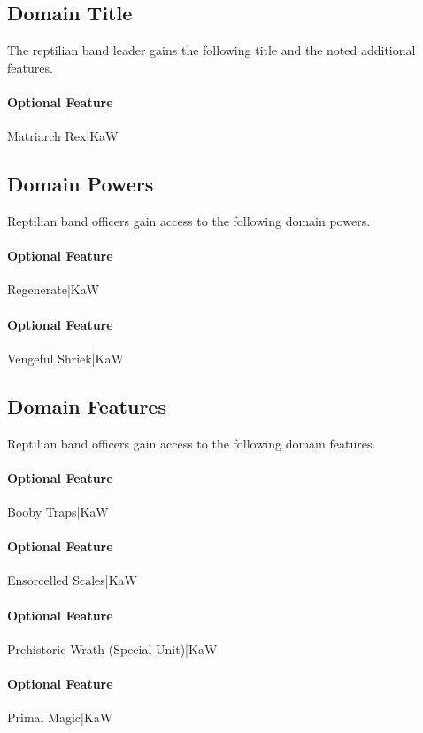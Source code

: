 \documentclass[10pt,a4paper,twoside,bg=print,twocolumn,openany,nodeprecatedcode]{dndbook}
\begin{document}
\subsection{Domain Title}
The reptilian band leader gains the following title and the noted additional features.

\paragraph{Optional Feature}
Matriarch Rex|KaW

\subsection{Domain Powers}
Reptilian band officers gain access to the following domain powers.

\paragraph{Optional Feature}
Regenerate|KaW

\paragraph{Optional Feature}
Vengeful Shriek|KaW

\subsection{Domain Features}
Reptilian band officers gain access to the following domain features.

\paragraph{Optional Feature}
Booby Traps|KaW

\paragraph{Optional Feature}
Ensorcelled Scales|KaW

\paragraph{Optional Feature}
Prehistoric Wrath (Special Unit)|KaW

\paragraph{Optional Feature}
Primal Magic|KaW
\end{document}
